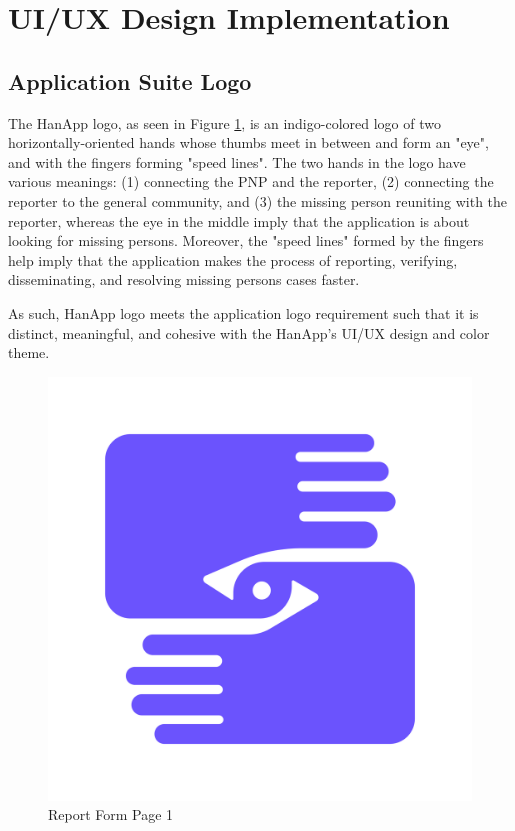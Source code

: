 \section{UI/UX Design Implementation}

\subsection{Application Suite Logo}

The HanApp logo, as seen in Figure \ref{fig:hanappLogo}, is an indigo-colored logo of two horizontally-oriented hands whose thumbs meet in between and form an "eye", and with the fingers forming "speed lines". The two hands in the logo have various meanings: (1) connecting the PNP and the reporter, (2) connecting the reporter to the general community, and (3) the missing person reuniting with the reporter, whereas the eye in the middle imply that the application is about looking for missing persons. Moreover, the "speed lines" formed by the fingers help imply that the application makes the process of reporting, verifying, disseminating, and resolving missing persons cases faster. 

As such, HanApp logo meets the application logo requirement such that it is distinct, meaningful, and cohesive with the HanApp's UI/UX design and color theme.
\begin{figure}[!h]
    \centering
    \begin{minipage}[c]{0.50\linewidth}
        \centering
        \includegraphics[scale=0.15]{figures/hanappLogo.png}
        \caption{Report Form Page 1}
        \label{fig:hanappLogo}
    \end{minipage}
\end{figure}

